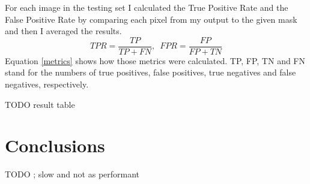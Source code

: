 \documentclass[12pt]{article}
\begin{document}
	For each image in the testing set I calculated the True Positive Rate and the False Positive Rate by comparing each pixel from my output to the given mask and then I averaged the results.
	\begin{equation}
	\label{metrics}
		TPR = \frac{TP}{TP + FN}, \,\,\, FPR = \frac{FP}{FP + TN}
	\end{equation}
	Equation \ref{metrics} shows how those metrics were calculated. TP, FP, TN and FN stand for the numbers of true positives, false positives, true negatives and false negatives, respectively.
	
	TODO result table
	
	\section{Conclusions}
	TODO ; slow and not as performant
	
	\newpage
	
	
\end{document}
